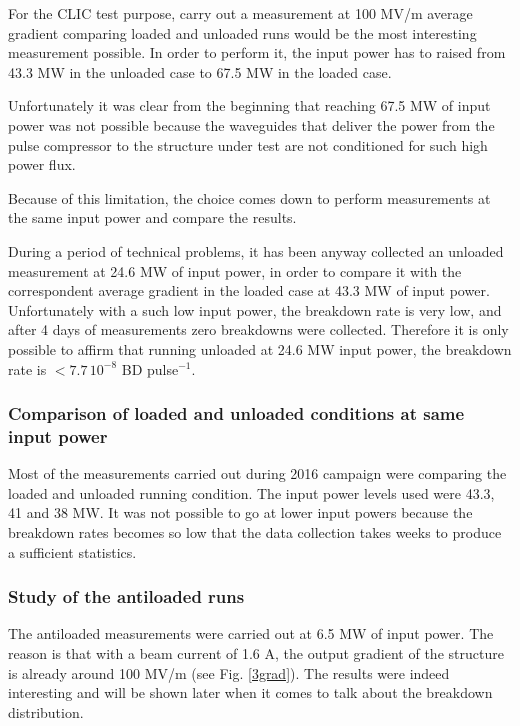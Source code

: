 For the CLIC test purpose,  carry out a measurement at 100 MV/m average gradient comparing loaded and unloaded runs would be the most interesting measurement possible. In order to perform it, the input power has to raised from 43.3 MW in the unloaded case to 67.5 MW in the loaded case. 

Unfortunately it was clear from the beginning that reaching 67.5 MW of input power was not possible because the waveguides that deliver the power from the pulse compressor to the structure under test are not conditioned for such high power flux.

Because of this limitation, the choice comes down to perform measurements at the same input power and compare the results. 

During a period of technical problems, it has been anyway collected an unloaded measurement at 24.6 MW of input power, in order to compare it with the correspondent average gradient in the loaded case at 43.3 MW of input power. Unfortunately with a such low input power, the breakdown rate is very low, and after 4 days of measurements zero breakdowns were collected. Therefore it is only possible to affirm that running unloaded at 24.6 MW input power, the breakdown rate is $< 7.7 \, 10^{-8} $ BD pulse$^{-1}$. 


\subsubsection{Comparison of loaded and unloaded conditions at same input power}

Most of the measurements carried out during 2016 campaign were comparing the loaded and unloaded running condition. The input power levels used were 43.3, 41 and 38 MW. It was not possible to go at lower input powers because the breakdown rates becomes so low that the data collection takes weeks to produce a sufficient statistics.


\subsubsection{Study of the antiloaded runs}

The antiloaded measurements were carried out at 6.5 MW of input power. The reason is that with a beam current  of 1.6 A, the output gradient of the structure is already around 100 MV/m (see Fig. \ref{3grad}). The results were indeed interesting and will be shown later when it comes to talk about the breakdown distribution.




